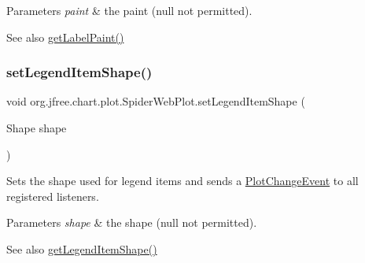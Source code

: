 \begin{DoxyParams}{Parameters}
{\em paint} & the paint ({\ttfamily null} not permitted).\\
\hline
\end{DoxyParams}
\begin{DoxySeeAlso}{See also}
\mbox{\hyperlink{classorg_1_1jfree_1_1chart_1_1plot_1_1_spider_web_plot_a89122725e5bb2963445c64d779f386c7}{get\+Label\+Paint()}} 
\end{DoxySeeAlso}
\mbox{\label{classorg_1_1jfree_1_1chart_1_1plot_1_1_spider_web_plot_a0e62740eed3460f77015809f41fdfaea}} 
\subsubsection{\texorpdfstring{set\+Legend\+Item\+Shape()}{setLegendItemShape()}}
{\footnotesize\ttfamily void org.\+jfree.\+chart.\+plot.\+Spider\+Web\+Plot.\+set\+Legend\+Item\+Shape (\begin{DoxyParamCaption}\item[{Shape}]{shape }\end{DoxyParamCaption})}

Sets the shape used for legend items and sends a \mbox{\hyperlink{}{Plot\+Change\+Event}} to all registered listeners.


\begin{DoxyParams}{Parameters}
{\em shape} & the shape ({\ttfamily null} not permitted).\\
\hline
\end{DoxyParams}
\begin{DoxySeeAlso}{See also}
\mbox{\hyperlink{classorg_1_1jfree_1_1chart_1_1plot_1_1_spider_web_plot_af1384896a267b06d1f0265ee0a34f484}{get\+Legend\+Item\+Shape()}} 
\end{DoxySeeAlso}
\mbox{\label{classorg_1_1jfree_1_1chart_1_1plot_1_1_spider_web_plot_ab89290b685699d2351f594c7157689ee}} 
